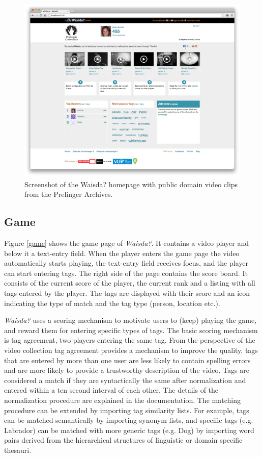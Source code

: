 \begin{figure}[t!]
\centering
\includegraphics[width=\columnwidth]{figs/homepage} 
\caption{Screenshot of the Waisda? homepage with public domain video clips from the Prelinger Archives.}
\label{homepage}
\end{figure}

\subsection{Game}\label{sec:waisda-game}

Figure \ref{game} shows the game page of \textit{Waisda?}. It contains a video player and below it a text-entry field. When the player enters the game page the video automatically starts playing, the text-entry field receives focus, and the player can start entering tags. The right side of the page contains the score board. It consists of the current score of the player, the current rank and a listing with all tags entered by the player.
The tags are displayed with their score and an icon indicating the type of match and the tag type (person, location etc.).

\textit{Waisda?} uses a scoring mechanism to motivate users to (keep) playing the game, and reward them for entering specific types of tags. The basic scoring mechanism is tag agreement, two players entering the same tag. From the perspective of the video collection tag agreement provides a mechanism to improve the quality, tags that are entered by more than one user are less likely to contain spelling errors and are more likely to provide a trustworthy description of the video. Tags are considered a match if they are syntactically
the same after normalization and entered within a ten second interval of each other. The details of the normalization procedure are explained in the documentation. The matching procedure can be extended by importing tag similarity lists. For example, tags can be matched semantically by importing synonym lists, and specific tags (e.g. Labrador) can be matched with more generic tags (e.g. Dog) by importing word pairs derived from the hierarchical structures of linguistic or domain specific thesauri.

